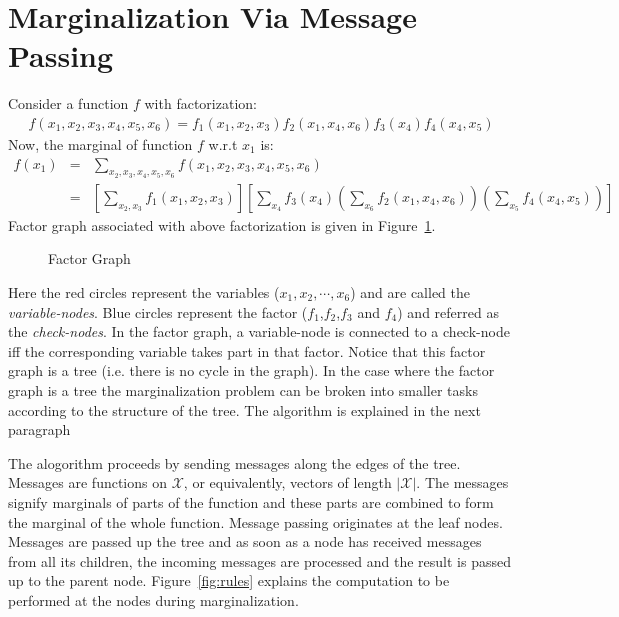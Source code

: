 \section{Marginalization Via Message Passing}
Consider a function $f$ with factorization:
\begin{align}
\ f(x_1,x_2,x_3,x_4,x_5,x_6)=f_1(x_1,x_2,x_3)f_2(x_1,x_4,x_6)f_3(x_4)f_4(x_4, x_5)
\end{align}
Now, the marginal of function $f$ w.r.t $x_1$ is:
\begin{eqnarray}
f(x_1) 	&=&\sum_{x_2, x_3, x_4, x_5, x_6} f(x_1,x_2,x_3,x_4,x_5,x_6) \\
	&=&\left[\sum_{x_2, x_3} f_1(x_1, x_2, x_3)\right]\left[\sum_{x_4}f_3(x_4)\left(\sum_{x_6}f_2(x_1, x_4, x_6)\right)\left(\sum_{x_5}f_4(x_4, x_5)\right)\right]
\end{eqnarray}
Factor graph associated with above factorization is given in Figure~\ref{fig:map0}. 
\begin{figure}[b]
\begin{center}

\end{center}
\caption{Factor Graph \label{fig:map0}}
\end{figure}
Here the red circles represent the variables ($x_1,x_2,\cdots,x_6$) and are called the \textit{variable-nodes}. Blue circles represent the factor ($f_1$,$f_2$,$f_3$ and $f_4$) 
and referred as the \textit{check-nodes}. In the factor graph, a variable-node is connected to a check-node iff the corresponding variable takes part in that factor.
Notice that this factor graph is a tree (i.e. there is no cycle in the graph). In the case where the factor graph is a tree the marginalization problem can be broken into smaller
tasks according to the structure of the tree. The algorithm is explained in the next paragraph

The alogorithm proceeds by sending messages along the edges of the tree. Messages are functions on $\mathcal{X}$, or equivalently, vectors of length $\left|\mathcal{X}\right|$.
The messages signify marginals of parts of the function and these parts are combined to form the marginal of the whole function. Message passing originates at the leaf nodes.
Messages are passed up the tree and as soon as a node has received messages from all its children, the incoming messages are processed and the result is passed up to the parent node.
Figure~\ref{fig:rules} explains the computation to be performed at the nodes during marginalization.

